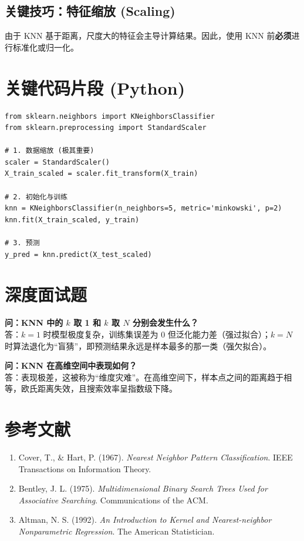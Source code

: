 \documentclass[12pt, a4paper]{article}
\begin{document}
\subsection{关键技巧：特征缩放 (Scaling)}
由于 KNN 基于距离，尺度大的特征会主导计算结果。因此，使用 KNN 前\textbf{必须}进行标准化或归一化。

\section{关键代码片段 (Python)}
\begin{lstlisting}
from sklearn.neighbors import KNeighborsClassifier
from sklearn.preprocessing import StandardScaler

# 1. 数据缩放 (极其重要)
scaler = StandardScaler()
X_train_scaled = scaler.fit_transform(X_train)

# 2. 初始化与训练
knn = KNeighborsClassifier(n_neighbors=5, metric='minkowski', p=2)
knn.fit(X_train_scaled, y_train)

# 3. 预测
y_pred = knn.predict(X_test_scaled)
\end{lstlisting}

\section{深度面试题}

\textbf{问：KNN 中的 $k$ 取 1 和 $k$ 取 $N$ 分别会发生什么？}\\
答：$k=1$ 时模型极度复杂，训练集误差为 0 但泛化能力差（强过拟合）；$k=N$ 时算法退化为“盲猜”，即预测结果永远是样本最多的那一类（强欠拟合）。

\textbf{问：KNN 在高维空间中表现如何？}\\
答：表现极差，这被称为“维度灾难”。在高维空间下，样本点之间的距离趋于相等，欧氏距离失效，且搜索效率呈指数级下降。

\section{参考文献}
\begin{enumerate}
    \item Cover, T., \& Hart, P. (1967). \textit{Nearest Neighbor Pattern Classification}. IEEE Transactions on Information Theory.
    \item Bentley, J. L. (1975). \textit{Multidimensional Binary Search Trees Used for Associative Searching}. Communications of the ACM.
    \item Altman, N. S. (1992). \textit{An Introduction to Kernel and Nearest-neighbor Nonparametric Regression}. The American Statistician.
\end{enumerate}
\end{document}
